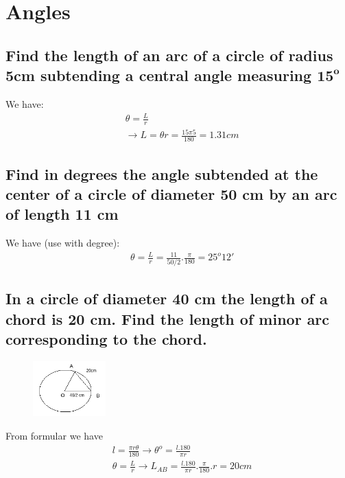 \documentclass{article}
\begin{document}
\tableofcontents

\newpage
\section{Angles}
\begin{multicols}{2}

\subsection{Find the length of an arc of a circle of radius 5cm subtending a central angle measuring $\mathbf{15^o}$}
We have:
\begin{align*}
    &\theta = \frac{L}{r} \\
    &\rightarrow L = \theta r = \frac{15\pi 5}{180} = 1.31 cm
\end{align*}

\subsection{Find in degrees the angle subtended at the center of a circle of diameter 50 cm by an arc of length 11 cm}
We have (use with degree):
\begin{align*}
    &\theta = \frac{L}{r} = \frac{11}{50/2}.\frac{\pi}{180} = 25^o12'
\end{align*}

\subsection{In a circle of diameter 40 cm the length of a chord is 20 cm. Find the length of minor arc corresponding to the chord.}

\begin{figure}[H]
    \centering
    \includegraphics[width=0.25\textwidth]{begin-angles6.png}
\end{figure}

From formular we have
\begin{align*}
    &l = \frac{\pi r \theta}{180} \rightarrow \theta^o= \frac{l.180}{\pi r} \\
    &\theta = \frac{L}{r} \rightarrow L_{AB} = \frac{l.180}{\pi r}.\frac{\pi}{180}.r = 20cm
\end{align*}



\end{multicols}
\end{document}
